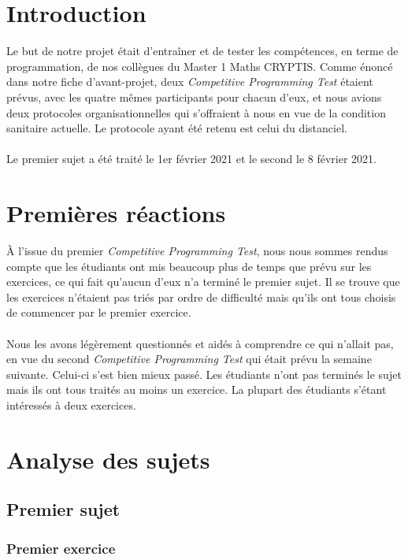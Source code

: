 \documentclass[12pt]{article}
\begin{document}
\tableofcontents
\pagebreak

\section{Introduction}
Le but de notre projet était d'entraîner et de tester les compétences, en terme de programmation, de nos collègues du \textsf{Master 1 Maths CRYPTIS}. Comme énoncé dans notre fiche d'avant-projet, deux \textsl{Competitive Programming Test} étaient prévus, avec les quatre mêmes participants pour chacun d'eux, et nous avions deux protocoles organisationnelles qui s'offraient à nous en vue de la condition sanitaire actuelle. Le protocole ayant été retenu est celui du distanciel.\\
\\
Le premier sujet a été traité le 1er février 2021 et le second le 8 février 2021.

\vfill \eject

\section{Premières réactions}
À l'issue du premier \textsl{Competitive Programming Test}, nous nous sommes rendus compte que les étudiants ont mis beaucoup plus de temps que prévu sur les exercices, ce qui fait qu'aucun d'eux n'a terminé le premier sujet. Il se trouve que les exercices n'étaient pas triés par ordre de difficulté mais qu'ils ont tous choisis de commencer par le premier exercice.\\\\

Nous les avons légèrement questionnés et aidés à comprendre ce qui n'allait pas, en vue du second \textsl{Competitive Programming Test} qui était prévu la semaine suivante. Celui-ci s'est bien mieux passé. Les étudiants n'ont pas terminés le sujet mais ils ont tous traités au moins un exercice. La plupart des étudiants s'étant intéressés à deux exercices.

\section{Analyse des sujets}
\subsection{Premier sujet}
\subsubsection{Premier exercice}
\end{document}
